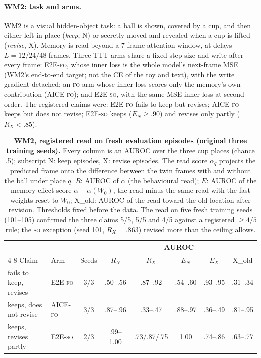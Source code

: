 \documentclass[11pt]{article}
\newcommand{\FO}{\textsc{fo}}
\newcommand{\SO}{\textsc{so}}
\begin{document}
\paragraph{WM2: task and arms.} WM2 is a visual hidden-object task: a ball is shown, covered by a cup,
and then either left in place (\emph{keep}, N) or secretly moved and revealed when a cup is lifted
(\emph{revise}, X). Memory is read beyond a 7-frame attention window, at delays $L=12/24/48$ frames.
Three TTT arms share a fixed step size and write after every frame: E2E-\FO, whose inner loss is the
whole model's next-frame MSE (WM2's end-to-end target; not the CE of the toy and text), with the write
gradient detached; an \FO{} arm whose inner loss scores only the memory's own contribution (AICE-\FO);
and E2E-\SO, with the same MSE inner loss at second order. The registered claims
were: E2E-\FO{} fails to keep but revises; AICE-\FO{} keeps but does not revise; E2E-\SO{} keeps
($E_N\ge.90$) and revises only partly ($R_X<.85$).

\begin{table}[!htbp]
\centering
\caption{\textbf{WM2, registered read on fresh evaluation episodes (original three training seeds).}
Every column is an AUROC over the three cup places (chance .5); subscript N: keep episodes, X: revise
episodes. The read score $\alpha_q$ projects the predicted frame onto the difference between the twin
frames with and without the ball under place $q$. $R$: AUROC of $\alpha$ (the behavioural read); $E$:
AUROC of the memory-effect score $\alpha-\alpha(W_0)$, the read minus the same read with the fast
weights reset to $W_0$; X\_old: AUROC of the read toward the old location after revision. Thresholds
fixed before the data. The read on five fresh training seeds (101--105) confirmed the three
claims 5/5, 5/5 and 4/5 against a registered $\ge4/5$ rule; the \SO{} exception (seed 101,
$R_X=.863$) revised more than the ceiling allows.}
\label{tab:wm2}
\small
\setlength{\tabcolsep}{3pt}
\begin{tabular}{@{}llcccccc@{}}
\toprule
& & & \multicolumn{5}{c}{AUROC} \\
\cmidrule(l){4-8}
Claim & Arm & Seeds & $R_N$ & $R_X$ & $E_N$ & $E_X$ & X\_old \\
\midrule
fails to keep, revises & E2E-\FO{} & 3/3 & .50--.56 & .87--.92 & .54--.60 & .93--.95 & .31--.34 \\
keeps, does not revise & AICE-\FO{} & 3/3 & .87--.96 & .33--.47 & .88--.97 & .36--.49 & .81--.95 \\
keeps, revises partly & E2E-\SO{} & 2/3 & .99--1.00 & .73/.87/.75 & 1.00 & .74--.86 & .63--.77 \\
\bottomrule
\end{tabular}
\end{table}
\end{document}
